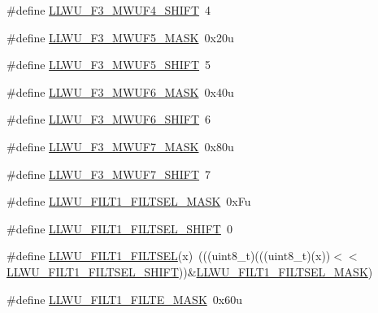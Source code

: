 \begin{DoxyCompactItemize}
\#define \hyperlink{group___l_l_w_u___register___masks_gac1d2eb89a620cf503f11eecf9e8ece1f}{L\+L\+W\+U\+\_\+\+F3\+\_\+\+M\+W\+U\+F4\+\_\+\+S\+H\+I\+FT}~4
\item 
\#define \hyperlink{group___l_l_w_u___register___masks_gaeb14754fa2d5b4c1fd50b9df98f11b01}{L\+L\+W\+U\+\_\+\+F3\+\_\+\+M\+W\+U\+F5\+\_\+\+M\+A\+SK}~0x20u
\item 
\#define \hyperlink{group___l_l_w_u___register___masks_gac8a9d2de72a5034fae66714d25aa5f33}{L\+L\+W\+U\+\_\+\+F3\+\_\+\+M\+W\+U\+F5\+\_\+\+S\+H\+I\+FT}~5
\item 
\#define \hyperlink{group___l_l_w_u___register___masks_gabd1f915448c7918a8aabc74239d7e773}{L\+L\+W\+U\+\_\+\+F3\+\_\+\+M\+W\+U\+F6\+\_\+\+M\+A\+SK}~0x40u
\item 
\#define \hyperlink{group___l_l_w_u___register___masks_gaab649d98d5d8eb9f2f272649ace225c4}{L\+L\+W\+U\+\_\+\+F3\+\_\+\+M\+W\+U\+F6\+\_\+\+S\+H\+I\+FT}~6
\item 
\#define \hyperlink{group___l_l_w_u___register___masks_ga2ddb11dc5e9f8a8404ccf99f10046b5a}{L\+L\+W\+U\+\_\+\+F3\+\_\+\+M\+W\+U\+F7\+\_\+\+M\+A\+SK}~0x80u
\item 
\#define \hyperlink{group___l_l_w_u___register___masks_gaee31def5b074844cbf46f9d7e54d2d4f}{L\+L\+W\+U\+\_\+\+F3\+\_\+\+M\+W\+U\+F7\+\_\+\+S\+H\+I\+FT}~7
\item 
\#define \hyperlink{group___l_l_w_u___register___masks_gaa44e21d07f509d1f5d6cec9da32ab8ab}{L\+L\+W\+U\+\_\+\+F\+I\+L\+T1\+\_\+\+F\+I\+L\+T\+S\+E\+L\+\_\+\+M\+A\+SK}~0x\+Fu
\item 
\#define \hyperlink{group___l_l_w_u___register___masks_gaab2a7991b2b135f0557b1b41cc3528f7}{L\+L\+W\+U\+\_\+\+F\+I\+L\+T1\+\_\+\+F\+I\+L\+T\+S\+E\+L\+\_\+\+S\+H\+I\+FT}~0
\item 
\#define \hyperlink{group___l_l_w_u___register___masks_ga9d7876a517542c2fa363b9f15d375d69}{L\+L\+W\+U\+\_\+\+F\+I\+L\+T1\+\_\+\+F\+I\+L\+T\+S\+EL}(x)~(((uint8\+\_\+t)(((uint8\+\_\+t)(x))$<$$<$\hyperlink{group___l_l_w_u___register___masks_gaab2a7991b2b135f0557b1b41cc3528f7}{L\+L\+W\+U\+\_\+\+F\+I\+L\+T1\+\_\+\+F\+I\+L\+T\+S\+E\+L\+\_\+\+S\+H\+I\+FT}))\&\hyperlink{group___l_l_w_u___register___masks_gaa44e21d07f509d1f5d6cec9da32ab8ab}{L\+L\+W\+U\+\_\+\+F\+I\+L\+T1\+\_\+\+F\+I\+L\+T\+S\+E\+L\+\_\+\+M\+A\+SK})
\item 
\#define \hyperlink{group___l_l_w_u___register___masks_gae449f984f9cfeec99ab8380e356b57c7}{L\+L\+W\+U\+\_\+\+F\+I\+L\+T1\+\_\+\+F\+I\+L\+T\+E\+\_\+\+M\+A\+SK}~0x60u
\item 
$$
\end{DoxyCompactItemize}
